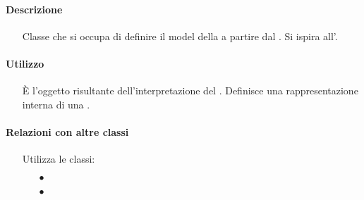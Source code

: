 \paragraph*{Descrizione}
\begin{itemize}
\item[] Classe che si occupa di definire il model della  a partire dal . Si ispira all'.
\end{itemize}

\paragraph*{Utilizzo}
\begin{itemize}
\item[] È l'oggetto risultante dell'interpretazione del . Definisce una rappresentazione interna di una .
\end{itemize}

\paragraph*{Relazioni con altre classi}
\begin{itemize}


\item[] Utilizza le classi:
\begin{itemize}
\item[$\bullet$] 
\item[$\bullet$] 
\end{itemize}
\end{itemize}

